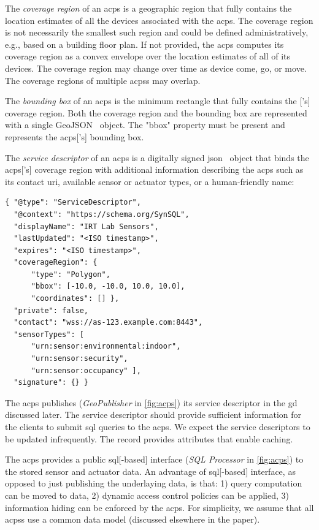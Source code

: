 
The \emph{coverage region} of an \gls{acps} is a geographic region that fully contains the location estimates of all the devices associated with the \gls{acps}. The coverage region is not necessarily the smallest such region and could be defined administratively, e.g., based on a building floor plan. If not provided, the \gls{acps} computes its coverage region as a convex envelope over the location estimates of all of its devices. The coverage region may change over time as device come, go, or move. The coverage regions of multiple \glspl{acps} may overlap.

The \emph{bounding box} of an \gls{acps} is the minimum rectangle that fully contains the ['s] coverage region. Both the coverage region and the bounding box are represented with a single GeoJSON~\cite{rfc7946} object. The "bbox" property must be present and represents the \gls{acps}['s] bounding box.

The \emph{service descriptor} of an \gls{acps} is a digitally signed \gls{json}~\cite{rfc8259} object that binds the \gls{acps}['s] coverage region with additional information describing the \gls{acps} such as its contact \gls{uri}, available sensor or actuator types, or a human-friendly name:
\begin{verbatim}
{ "@type": "ServiceDescriptor",
  "@context": "https://schema.org/SynSQL",
  "displayName": "IRT Lab Sensors",
  "lastUpdated": "<ISO timestamp>",
  "expires": "<ISO timestamp>",
  "coverageRegion": {
      "type": "Polygon",
      "bbox": [-10.0, -10.0, 10.0, 10.0],
      "coordinates": [] },
  "private": false,
  "contact": "wss://as-123.example.com:8443",
  "sensorTypes": [
      "urn:sensor:environmental:indoor",
      "urn:sensor:security",
      "urn:sensor:occupancy" ],
  "signature": {} }
\end{verbatim}

The \gls{acps} publishes (\emph{GeoPublisher} in \cref{fig:acps}) its service descriptor in the \gls{gd} discussed later.  The service descriptor should provide sufficient information for the clients to submit \gls{sql} queries to the \gls{acps}. We expect the service descriptors to be updated infrequently. The record provides attributes that enable caching.

The \gls{acps} provides a public \gls{sql}[-based] interface (\emph{SQL Processor} in \cref{fig:acps}) to the stored sensor and actuator data. An advantage of \gls{sql}[-based] interface, as opposed to just publishing the underlaying data, is that: 1) query computation can be moved to data, 2) dynamic access control policies can be applied, 3) information hiding can be enforced by the \gls{acps}. For simplicity, we assume that all \glspl{acps} use a common data model (discussed elsewhere in the paper).

